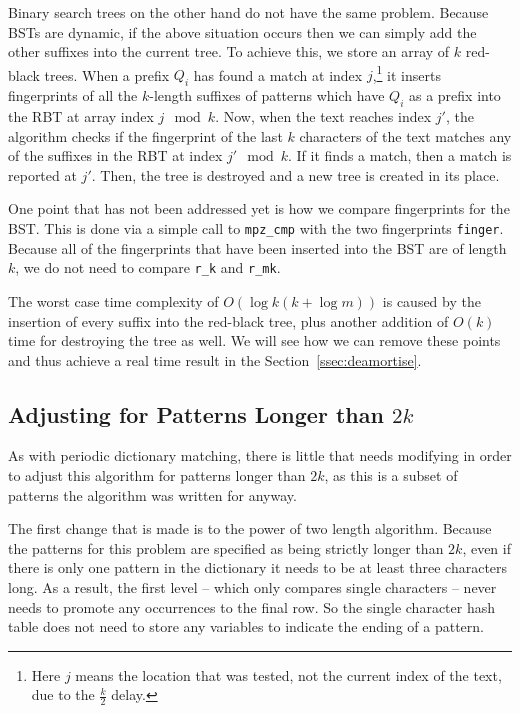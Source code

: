 \documentclass[ %
                    author={Dominic Joseph Moylett},
                    degree={MEng},
                     title={Dictionary Matching with Fingerprints},
                  subtitle={An Empirical Analysis},
                      type={research},
                      year={2015} ]{dissertation}
\begin{document}
Binary search trees on the other hand do not have the same problem. Because BSTs are dynamic, if the above situation occurs then we can simply add the other suffixes into the current tree. To achieve this, we store an array of $k$ red-black trees. When a prefix $Q_i$ has found a match at index $j$,\footnote{Here $j$ means the location that was tested, not the current index of the text, due to the $\frac{k}{2}$ delay.} it inserts fingerprints of all the $k$-length suffixes of patterns which have $Q_i$ as a prefix into the RBT at array index $j \mod k$. Now, when the text reaches index $j'$, the algorithm checks if the fingerprint of the last $k$ characters of the text matches any of the suffixes in the RBT at index $j' \mod k$. If it finds a match, then a match is reported at $j'$. Then, the tree is destroyed and a new tree is created in its place.

One point that has not been addressed yet is how we compare fingerprints for the BST. This is done via a simple call to \texttt{mpz\_cmp} with the two fingerprints \texttt{finger}. Because all of the fingerprints that have been inserted into the BST are of length $k$, we do not need to compare \texttt{r\_k} and \texttt{r\_mk}.

The worst case time complexity of $O(\log k(k + \log m))$ is caused by the insertion of every suffix into the red-black tree, plus another addition of $O(k)$ time for destroying the tree as well. We will see how we can remove these points and thus achieve a real time result in the Section~\ref{ssec:deamortise}.

\subsection{Adjusting for Patterns Longer than $2k$}

As with periodic dictionary matching, there is little that needs modifying in order to adjust this algorithm for patterns longer than $2k$, as this is a subset of patterns the algorithm was written for anyway.

The first change that is made is to the power of two length algorithm. Because the patterns for this problem are specified as being strictly longer than $2k$, even if there is only one pattern in the dictionary it needs to be at least three characters long. As a result, the first level -- which only compares single characters -- never needs to promote any occurrences to the final row. So the single character hash table does not need to store any variables to indicate the ending of a pattern.
\end{document}
